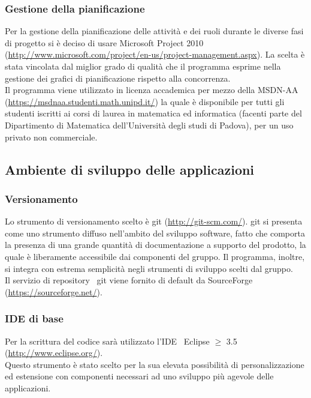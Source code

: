 {{		\subsubsection{Gestione della pianificazione}{
			Per la gestione della pianificazione delle attività e dei ruoli durante le diverse fasi di progetto si è deciso di usare Microsoft Project 2010 (\url{http://www.microsoft.com/project/en-us/project-management.aspx}).
			La scelta è stata vincolata dal miglior grado di qualità che il programma esprime nella gestione dei grafici di pianificazione rispetto alla concorrenza.\\
			Il programma viene utilizzato in licenza accademica per mezzo della MSDN-AA (\url{https://msdnaa.studenti.math.unipd.it/}) la quale è disponibile per tutti gli studenti iscritti ai corsi di laurea in matematica ed informatica (facenti parte del Dipartimento di Matematica dell'Università degli studi di Padova), per un uso privato non commerciale.
		}
	}

	\subsection{Ambiente di sviluppo delle applicazioni} {
		\subsubsection{Versionamento}{
		\label{git}
		Lo strumento di versionamento scelto è git (\url{http://git-scm.com/}).
		git si presenta come uno strumento diffuso nell'ambito del sviluppo software\g , fatto che comporta la presenza di una grande quantità di documentazione a supporto del prodotto, la quale è liberamente accessibile dai componenti del gruppo. 
		Il programma, inoltre, si integra con estrema semplicità negli strumenti di sviluppo scelti dal gruppo.\\
		Il servizio di repository\g~ git viene fornito di default da  SourceForge (\url{https://sourceforge.net/}).
		}
		
		\subsubsection{IDE di base}\label{IDEEclipse}{
			Per la scrittura del codice sarà utilizzato l'IDE\g~ Eclipse $\geqslant$ 3.5 (\url{http://www.eclipse.org/}).\\
			Questo strumento è stato scelto per la sua elevata possibilità di personalizzazione ed estensione con componenti necessari ad uno sviluppo più agevole delle applicazioni.
		}
}}
